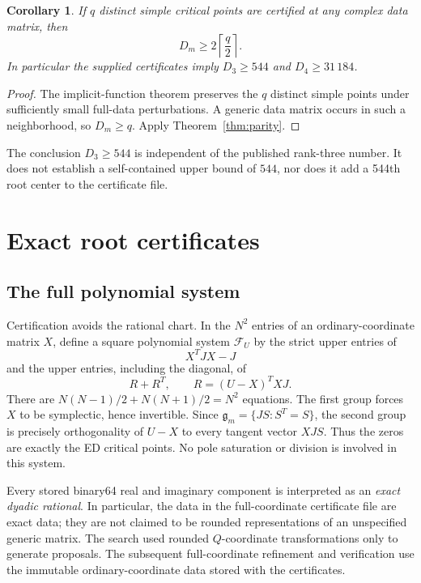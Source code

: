 \documentclass[11pt]{article}
\newtheorem{corollary}[theorem]{Corollary}
\theoremstyle{remark}\newtheorem{remark}[theorem]{Remark}
\newcommand{\rankfourbound}{31\,184}
\begin{document}
\begin{corollary}\label{cor:rounding}
If $q$ distinct simple critical points are certified at any complex data matrix, then
\[
D_m\ge 2\left\lceil\frac q2\right\rceil.
\]
In particular the supplied certificates imply $D_3\ge544$ and $D_4\ge\rankfourbound$.
\end{corollary}
\begin{proof}
The implicit-function theorem preserves the $q$ distinct simple points under sufficiently small full-data perturbations. A generic data matrix occurs in such a neighborhood, so $D_m\ge q$. Apply Theorem~\ref{thm:parity}.
\end{proof}
The conclusion $D_3\ge544$ is independent of the published rank-three number. It does not establish a self-contained upper bound of $544$, nor does it add a 544th root center to the certificate file.

\section{Exact root certificates}\label{sec:certificates}
\subsection{The full polynomial system}
Certification avoids the rational chart. In the $N^2$ entries of an ordinary-coordinate matrix $X$, define a square polynomial system $\mathcal F_U$ by the strict upper entries of
\[
X^TJX-J
\]
and the upper entries, including the diagonal, of
\begin{equation}\label{eq:certsystem}
R+R^T,\qquad R=(U-X)^TXJ.
\end{equation}
There are $N(N-1)/2+N(N+1)/2=N^2$ equations. The first group forces $X$ to be symplectic, hence invertible. Since $\mathfrak g_m=\{JS:S^T=S\}$, the second group is precisely orthogonality of $U-X$ to every tangent vector $XJS$. Thus the zeros are exactly the ED critical points. No pole saturation or division is involved in this system.

Every stored binary64 real and imaginary component is interpreted as an \emph{exact dyadic rational}. In particular, the data in the full-coordinate certificate file are exact data; they are not claimed to be rounded representations of an unspecified generic matrix. The search used rounded $Q$-coordinate transformations only to generate proposals. The subsequent full-coordinate refinement and verification use the immutable ordinary-coordinate data stored with the certificates.
\end{document}
